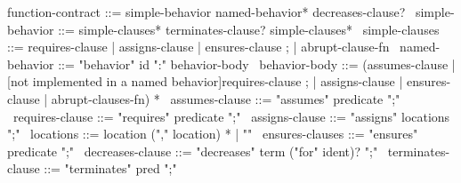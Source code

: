 \begin{syntax}
  function-contract ::= simple-behavior named-behavior* decreases-clause?
  \
  simple-behavior ::= simple-clauses* terminates-clause? simple-clauses*
  \
  simple-clauses ::= requires-clause | assigns-clause | ensures-clause ;
                   | {abrupt-clause-fn}
  \
  named-behavior ::= "behavior" id ":" behavior-body
  \
  behavior-body ::= (assumes-clause |
                     {[not implemented in a named behavior]requires-clause} ;
                    | assigns-clause | ensures-clause | {abrupt-clauses-fn}) *
              \
  assumes-clause ::= "assumes" predicate ";"
  \
  requires-clause ::= "requires" predicate ";"
  \
  assigns-clause ::= "assigns" locations ";"
  \
  locations ::= location ("," location) * | "\nothing"
  \
  ensures-clauses ::= "ensures" predicate ";"
  \
  decreases-clause ::= "decreases" term ("for" ident)? ";"
  \
  terminates-clause ::= "terminates" pred ";"
\end{syntax}
